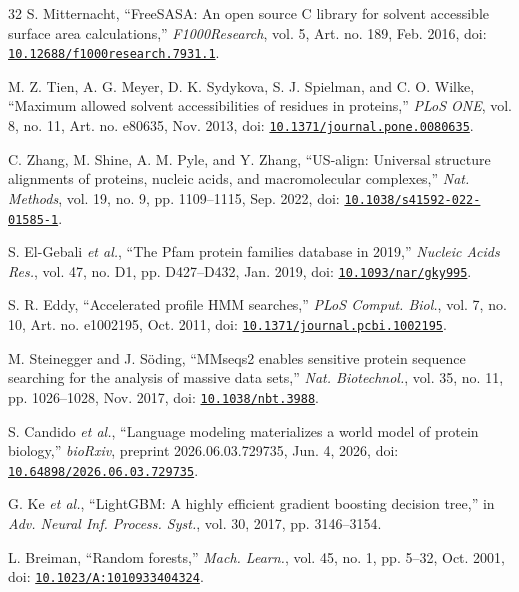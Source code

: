 \documentclass[conference]{IEEEtran}
\begin{document}
\begin{thebibliography}{32}
 S. Mitternacht, ``FreeSASA: An open source C library for solvent accessible surface area calculations,'' \textit{F1000Research}, vol. 5, Art. no. 189, Feb. 2016, doi: \href{https://doi.org/10.12688/f1000research.7931.1}{\nolinkurl{10.12688/f1000research.7931.1}}.

 M. Z. Tien, A. G. Meyer, D. K. Sydykova, S. J. Spielman, and C. O. Wilke, ``Maximum allowed solvent accessibilities of residues in proteins,'' \textit{PLoS ONE}, vol. 8, no. 11, Art. no. e80635, Nov. 2013, doi: \href{https://doi.org/10.1371/journal.pone.0080635}{\nolinkurl{10.1371/journal.pone.0080635}}.

 C. Zhang, M. Shine, A. M. Pyle, and Y. Zhang, ``US-align: Universal structure alignments of proteins, nucleic acids, and macromolecular complexes,'' \textit{Nat. Methods}, vol. 19, no. 9, pp. 1109--1115, Sep. 2022, doi: \href{https://doi.org/10.1038/s41592-022-01585-1}{\nolinkurl{10.1038/s41592-022-01585-1}}.

 S. El-Gebali \textit{et al.}, ``The Pfam protein families database in 2019,'' \textit{Nucleic Acids Res.}, vol. 47, no. D1, pp. D427--D432, Jan. 2019, doi: \href{https://doi.org/10.1093/nar/gky995}{\nolinkurl{10.1093/nar/gky995}}.

 S. R. Eddy, ``Accelerated profile HMM searches,'' \textit{PLoS Comput. Biol.}, vol. 7, no. 10, Art. no. e1002195, Oct. 2011, doi: \href{https://doi.org/10.1371/journal.pcbi.1002195}{\nolinkurl{10.1371/journal.pcbi.1002195}}.

 M. Steinegger and J. S\"oding, ``MMseqs2 enables sensitive protein sequence searching for the analysis of massive data sets,'' \textit{Nat. Biotechnol.}, vol. 35, no. 11, pp. 1026--1028, Nov. 2017, doi: \href{https://doi.org/10.1038/nbt.3988}{\nolinkurl{10.1038/nbt.3988}}.

 S. Candido \textit{et al.}, ``Language modeling materializes a world model of protein biology,'' \textit{bioRxiv}, preprint 2026.06.03.729735, Jun. 4, 2026, doi: \href{https://doi.org/10.64898/2026.06.03.729735}{\nolinkurl{10.64898/2026.06.03.729735}}.

 G. Ke \textit{et al.}, ``LightGBM: A highly efficient gradient boosting decision tree,'' in \textit{Adv. Neural Inf. Process. Syst.}, vol. 30, 2017, pp. 3146--3154.

 L. Breiman, ``Random forests,'' \textit{Mach. Learn.}, vol. 45, no. 1, pp. 5--32, Oct. 2001, doi: \href{https://doi.org/10.1023/A:1010933404324}{\nolinkurl{10.1023/A:1010933404324}}.
\end{thebibliography}
\end{document}
